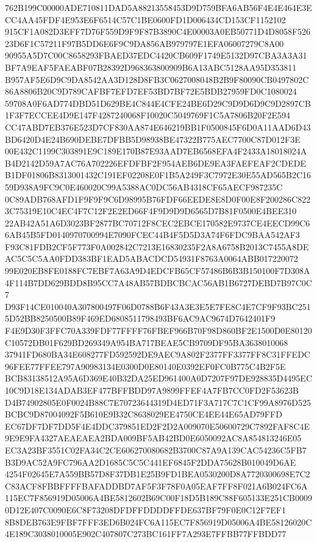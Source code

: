 \documentclass[UTF8,fontset=fandol,zihao=-4,a4paper]{ctexart}
\begin{document}
{{762B199C00000ADE710811DAD5A88213558453D9D759BFA6AB56F4E4E464E3ECC4AA45FDF4E953E6F6514C57C1BE0600FD1D006434CD153CF1152102
915CF1A082D3EFF7D76F559D9F9F87B3890C4E00003A0EB50771D4D8058F52623D6F1C57211F97B5DD6E6F9C9DA856AB979797E1EFA06007279C8A00
90955A5D7C00C8658293FBAED37EDC4420CB609F1749E5132D97CBA3A3A31BF7A9EAF5FAEABF07B28392D968363800909B6A13ABC5128AA95D353811
B957AF5E6D9C9DA8542AA3D128D8FB3C0627008048B2B9F80090CB0497802C86A8806B20C9D789CAFBF7EFD7EF53BD7BF72E5BDB27959FD0C1080024
59708A0F6AD774DBD51D629BE4C844E4CFE24BE6D29C9D9D6D9C9D2897CB1F3F7ECCEE4D9E147F4287240068F10020C5049769F1C5A7806B20F2E594
CC47ABD7EB376E523D7CF830AA874E646219BB1F0500845F6D0A11AAD6D43BD6420D4E24B690DEBE7DFBB5D98938BE47322B775AEC7700C87D012F3E
00E432C1199C303891E9C189E170B87E93AAD7EB6568EFA4F2433A18018024AB4D2142D59A7AC76A702226EFDFBF2F954AEB6DE9EA3FAEFEAF2CDEDE
B1DF01806B8313001432C191EF02208E0F1B5A249F3C7972E30E55AD565B2C1659D938A9FC9C0E460020C99A5388AC0DC56AB4318CF65AECF987235C
0C89ADB768AFD1F9F9F9C6D98995B76FDF66EEDE8E8D0F00E8F200286C8223C75319E10C4EC4F7C12F2E2ED66F4F9D9D9D6565D7B81F0500E4BEE310
22AB42A51A6D3023BF2877BC70712F8CEC2EBCE170582E9737CE4EECD99C66AB45B5FD0140970700994E7090FCEC44B4F5D5D3A74F6FDC9BAA542AF3
F93C81FDB2CF5F773F0A002842C7213E16830235F2A8A6758B2013C7455A8DEAC5C5C5AA0FDD383BF1EAD5ABACDCD54931F8763A0064ABB017220072
99E020EB8FE0188FC7EBF7A63A9D4EDCFB65CF57486B6B3B150100F7D308A4F114B7DD629BDD8B95CC7A48AB57BDBCBCAC56AB1B6727DEBD7B97C0C7
D93F14CE010040A307800497F06D0788B6F43A3E3E5E7FE8C4E7CF9F93BC2515D52BB8250500B89F469ED6808511798493BF6AC9AC9674D7642401F9
F4E9D30F3FFC70A339FDF77FFFF76FBEF966B70F98D860BF2E1500D0E80120C10572DB01F629BD269349A954BA717BEAE5CB9709DF95BA3638010068
37941FD680BA34E608277FD592592DE9AEC9A802F2377FF3377FF8C31FFEDC96FEE77FFEE797A90983134E0300D0E80140E0392EF0FC0B775C4B2F5E
BCB83138512A95A6D369E40B32DA25ED961400A0D7207F97DE928835D4495EC10C9D18E134ADAB3EF477BFFBDD97A9899FFEF4A7FB7CC0FD2F53623B
D4B74902805E0F0024B88C7E70723644319D4ED71F3A717C7C1CF99A8976D525BCBC9D87004092F5B610E9B32C8638029EE4750CE4EE44E65AD79FFD
EC67DF7DF7DD5F4E4DDC379851ED2F2D2A009070E50600729C7892FAF8C4E9E9E9FA4327AEAEAEA2BDA009BF5AB42BD0E6050092AC8A854813246E05
EC3A23BF3551C02FA34C2CE606270080682B3700C87A9A139CAC54236C5FB7B3D9AC52A9FC796AA2D1685C5C5C441EF6845F2DDA75628B010049D6AE
4254F02645E7A559BB57D8F37DB1E25B9FD1BEA0530200D8A7720300698E7C2C83ACF8FBBFFFFBAFADDBD7AF5F3F78F0A05EAF7FF8F021A6B024FC6A
115EC7F856919D05006A4BE5812602B69C00F18D5B189C88F605133E251CB00090D12E407C0090E6C8F73208DFDFFDDDDFFDE637BF79F0E0C12F7EF1
8B8DEB763E9FBF7FFF3ED6B024FC6A115EC7F856919D05006A4BE58126020C4E189C3038010005E902C407807C273BC161FF7A293E7FFBB77FFBDD77
}}
\end{document}
